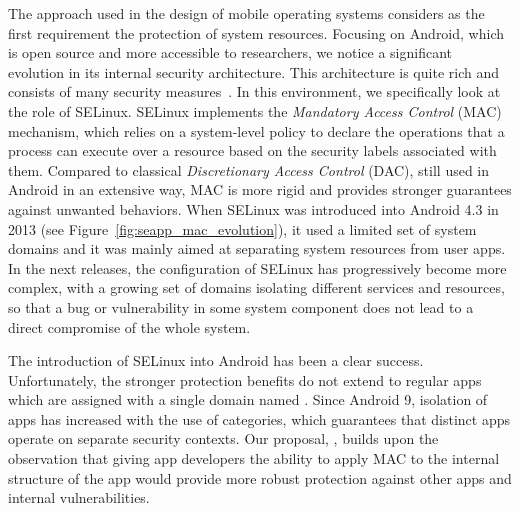 The approach used in the design of mobile operating systems considers
as the first requirement the protection of system resources.  Focusing
on Android, which is open source and more accessible to researchers,
we notice a significant evolution in its internal security
architecture.  This architecture is quite rich and consists of many
security measures~\cite{seapp_10.1145/2046707.2046779,seapp_tapsm_m}.
In this environment, we specifically look at the role of SELinux.
SELinux implements the {\em Mandatory Access Control} (MAC) mechanism,
which relies on a system-level policy to declare the operations that a
process can execute over a resource based on the security labels
associated with them.  Compared to classical {\em Discretionary Access
  Control} (DAC), still used in Android in an extensive way, MAC is
more rigid and provides stronger guarantees against unwanted
behaviors.  When SELinux was introduced into Android 4.3 in 2013 (see
Figure~\ref{fig:seapp_mac_evolution}), it used a limited set of system
domains and it was mainly aimed at separating system resources from
user apps.  In the next releases, the configuration of SELinux has
progressively become more complex, with a growing set of domains
isolating different services and resources, so that a bug or
vulnerability in some system component does not lead to a direct
compromise of the whole system.

The introduction of SELinux into Android has been a clear success.
Unfortunately, the stronger protection benefits do not extend to
regular apps which are assigned with a single domain named
\untrustedapp.  Since Android 9, isolation of apps has increased with
the use of categories, which guarantees that distinct apps operate on
separate security contexts.  Our proposal, \pap, builds upon the
observation that giving app developers the ability to apply MAC to the
internal structure of the app would provide more robust protection
against other apps and internal vulnerabilities.

